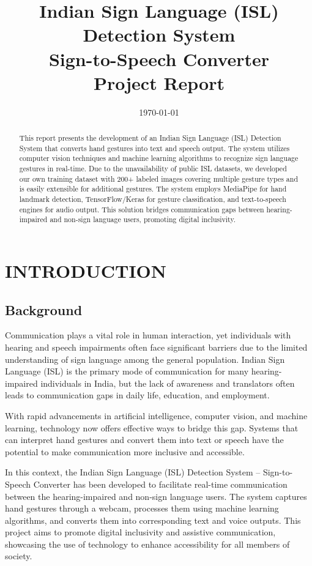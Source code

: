 \documentclass[12pt,a4paper]{report}
\title{\textbf{Indian Sign Language (ISL) Detection System\\Sign-to-Speech Converter}\\
\vspace{1em}
\Large Project Report}
\author{}
\date{\today}
\begin{document}
\maketitle

\begin{abstract}
This report presents the development of an Indian Sign Language (ISL) Detection System that converts hand gestures into text and speech output. The system utilizes computer vision techniques and machine learning algorithms to recognize sign language gestures in real-time. Due to the unavailability of public ISL datasets, we developed our own training dataset with 200+ labeled images covering multiple gesture types and is easily extensible for additional gestures. The system employs MediaPipe for hand landmark detection, TensorFlow/Keras for gesture classification, and text-to-speech engines for audio output. This solution bridges communication gaps between hearing-impaired and non-sign language users, promoting digital inclusivity.
\end{abstract}

\tableofcontents
\newpage

\chapter{INTRODUCTION}

\section{Background}

Communication plays a vital role in human interaction, yet individuals with hearing and speech impairments often face significant barriers due to the limited understanding of sign language among the general population. Indian Sign Language (ISL) is the primary mode of communication for many hearing-impaired individuals in India, but the lack of awareness and translators often leads to communication gaps in daily life, education, and employment.

With rapid advancements in artificial intelligence, computer vision, and machine learning, technology now offers effective ways to bridge this gap. Systems that can interpret hand gestures and convert them into text or speech have the potential to make communication more inclusive and accessible.

In this context, the Indian Sign Language (ISL) Detection System – Sign-to-Speech Converter has been developed to facilitate real-time communication between the hearing-impaired and non-sign language users. The system captures hand gestures through a webcam, processes them using machine learning algorithms, and converts them into corresponding text and voice outputs. This project aims to promote digital inclusivity and assistive communication, showcasing the use of technology to enhance accessibility for all members of society.
\end{document}
